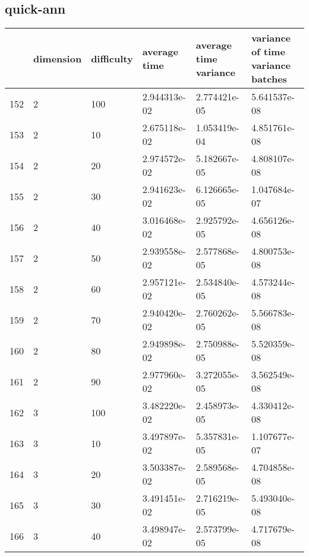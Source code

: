 \documentclass{article}
\begin{document}
\subsection{quick-ann}
\begin{center}
\begin{tabular}{llllll}
\toprule
{} & dimension & difficulty &  average time & average time variance & variance of time variance batches \\
\midrule
152 &         2 &        100 &  2.944313e-02 &          2.774421e-05 &                      5.641537e-08 \\
153 &         2 &         10 &  2.675118e-02 &          1.053419e-04 &                      4.851761e-08 \\
154 &         2 &         20 &  2.974572e-02 &          5.182667e-05 &                      4.808107e-08 \\
155 &         2 &         30 &  2.941623e-02 &          6.126665e-05 &                      1.047684e-07 \\
156 &         2 &         40 &  3.016468e-02 &          2.925792e-05 &                      4.656126e-08 \\
157 &         2 &         50 &  2.939558e-02 &          2.577868e-05 &                      4.800753e-08 \\
158 &         2 &         60 &  2.957121e-02 &          2.534840e-05 &                      4.573244e-08 \\
159 &         2 &         70 &  2.940420e-02 &          2.760262e-05 &                      5.566783e-08 \\
160 &         2 &         80 &  2.949898e-02 &          2.750988e-05 &                      5.520359e-08 \\
161 &         2 &         90 &  2.977960e-02 &          3.272055e-05 &                      3.562549e-08 \\
162 &         3 &        100 &  3.482220e-02 &          2.458973e-05 &                      4.330412e-08 \\
163 &         3 &         10 &  3.497897e-02 &          5.357831e-05 &                      1.107677e-07 \\
164 &         3 &         20 &  3.503387e-02 &          2.589568e-05 &                      4.704858e-08 \\
165 &         3 &         30 &  3.491451e-02 &          2.716219e-05 &                      5.493040e-08 \\
166 &         3 &         40 &  3.498947e-02 &          2.573799e-05 &                      4.717679e-08 \\

\end{tabular}
\end{center}
\end{document}
